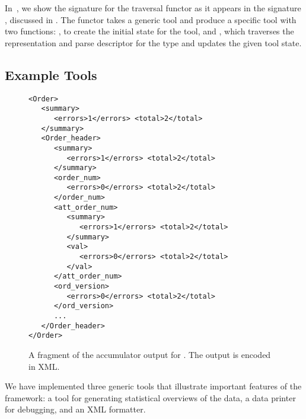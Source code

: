 In~, we show the signature for the
traversal functor as it appears in the signature ,
discussed in . The functor takes a generic
tool and produce a specific tool with two functions: , to
create the initial state for the tool, and , which
traverses the representation and parse descriptor for the type and
updates the given tool state.

\subsection{Example Tools}
\label{sec:gentool-motivation-ex}


\begin{figure}
  \centering
  \scriptsize
\begin{verbatim}
<Order>
   <summary>
      <errors>1</errors> <total>2</total>        
   </summary>
   <Order_header>
      <summary>
         <errors>1</errors> <total>2</total>        
      </summary>
      <order_num>
         <errors>0</errors> <total>2</total>        
      </order_num>
      <att_order_num>
         <summary>
            <errors>1</errors> <total>2</total>        
         </summary>
         <val>
            <errors>0</errors> <total>2</total>                
         </val>
      </att_order_num>
      <ord_version>
         <errors>0</errors> <total>2</total>                
      </ord_version>
      ...
   </Order_header>
</Order>
\end{verbatim}  
  \caption{A fragment of the accumulator output for \dibbler{}. The
    output is encoded in XML.}
  \label{fig:gentool-acc-output}
\end{figure}

We have implemented three generic tools that illustrate important
features of the framework: a tool for generating statistical
overviews of the data, a data printer for debugging, and an XML
formatter.

